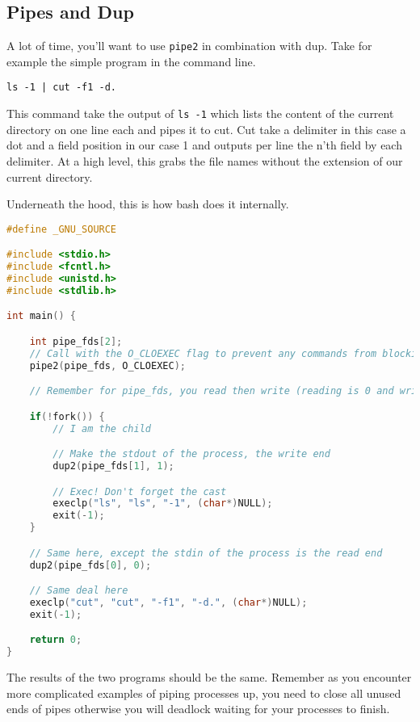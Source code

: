 \subsection{Pipes and Dup}

A lot of time, you'll want to use \texttt{pipe2} in combination with dup. Take for example the simple program in the command line.

\begin{verbatim}
ls -1 | cut -f1 -d.
\end{verbatim}

This command take the output of \texttt{ls -1} which lists the content of the current directory on one line each and pipes it to cut.
Cut take a delimiter in this case a dot and a field position in our case 1 and outputs per line the n'th field by each delimiter.
At a high level, this grabs the file names without the extension of our current directory.

Underneath the hood, this is how bash does it internally.


\begin{lstlisting}[language=C]
#define _GNU_SOURCE

#include <stdio.h>
#include <fcntl.h>
#include <unistd.h>
#include <stdlib.h>

int main() {

    int pipe_fds[2];
    // Call with the O_CLOEXEC flag to prevent any commands from blocking
    pipe2(pipe_fds, O_CLOEXEC);

    // Remember for pipe_fds, you read then write (reading is 0 and writing is 1)

    if(!fork()) {
        // I am the child

        // Make the stdout of the process, the write end
        dup2(pipe_fds[1], 1);

        // Exec! Don't forget the cast
        execlp("ls", "ls", "-1", (char*)NULL);
        exit(-1);
    }

    // Same here, except the stdin of the process is the read end
    dup2(pipe_fds[0], 0);

    // Same deal here
    execlp("cut", "cut", "-f1", "-d.", (char*)NULL);
    exit(-1);

    return 0;
}
\end{lstlisting}

The results of the two programs should be the same. Remember as you encounter more complicated examples of piping processes up, you need to close all unused ends of pipes otherwise you will deadlock waiting for your processes to finish.


